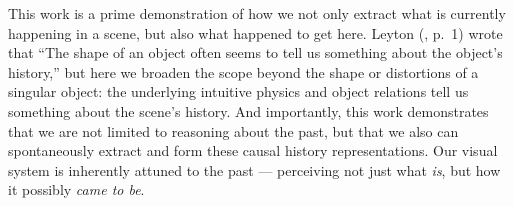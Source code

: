 This work is a prime demonstration of how we not only extract what is currently happening in a scene, but also what happened to get here.  Leyton (\citeyear{leyton_inferring_1989}, p.~1) wrote that “The shape of an object often seems to tell us something about the object’s history,” but here we broaden the scope beyond the shape or distortions of a singular object: the underlying intuitive physics and object relations tell us something about the scene’s history.  And importantly, this work demonstrates that we are not limited to reasoning about the past, but that we also can spontaneously extract and form these causal history representations.   Our visual system is inherently attuned to the past --- perceiving not just what \textit{is}, but how it possibly \textit{came to be}.
